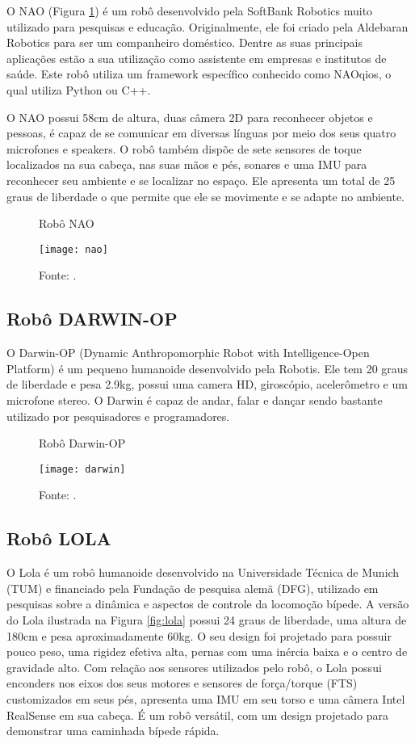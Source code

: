 O NAO (Figura \ref{fig:nao}) é um robô desenvolvido pela SoftBank Robotics muito utilizado para pesquisas e educação. Originalmente, ele foi criado pela Aldebaran Robotics para ser um companheiro doméstico. Dentre as suas principais aplicações estão a sua utilização como assistente em empresas e institutos de saúde. Este robô utiliza um framework específico conhecido como NAOqios, o qual utiliza Python ou C++.  

O NAO possui 58cm de altura, duas câmera 2D para reconhecer objetos e pessoas, é capaz de se comunicar em diversas línguas por meio dos seus quatro microfones e speakers. O robô também dispõe de sete sensores de toque localizados na sua cabeça, nas suas mãos e pés, sonares e uma IMU para reconhecer seu ambiente e se localizar no espaço. Ele apresenta um total de 25 graus de liberdade o que permite que ele se movimente e se adapte no ambiente.

\begin{figure} [H]	
    \centering
    \caption{Robô NAO}
    \texttt{[image: nao]}
    \caption*{Fonte: \cite{NAOxx}.}
    \label{fig:nao}
\end{figure}

\subsection{Robô DARWIN-OP}
\label{ssec:darwin}

O Darwin-OP (Dynamic Anthropomorphic Robot with Intelligence-Open Platform)  é um pequeno humanoide desenvolvido pela Robotis. Ele tem 20 graus de liberdade e pesa 2.9kg, possui uma camera HD, giroscópio, acelerômetro e um microfone stereo. O Darwin é capaz de andar, falar e dançar sendo bastante utilizado por pesquisadores e programadores.

\begin{figure} [H]
    \centering
    \caption{Robô Darwin-OP}
    \texttt{[image: darwin]}
    \caption*{Fonte: \cite{DARWINxx}.}
    \label{fig:darwin}
\end{figure}

\subsection{Robô LOLA}
\label{ssec:lola}

O Lola é um robô humanoide desenvolvido na Universidade Técnica de Munich (TUM) e financiado pela Fundação de pesquisa alemã (DFG), utilizado em pesquisas sobre a dinâmica e aspectos de controle da locomoção bípede. A versão do Lola ilustrada na Figura \ref{fig:lola} possui 24 graus de liberdade, uma altura de 180cm e pesa aproximadamente 60kg. O seu design foi projetado para possuir pouco peso, uma rigidez efetiva alta, pernas com uma inércia baixa e o centro de gravidade alto. Com relação aos sensores utilizados pelo robô, o Lola possui enconders nos eixos dos seus motores e sensores de força/torque (FTS) customizados em seus pés, apresenta uma IMU em seu torso e uma câmera Intel RealSense em sua cabeça. É um robô versátil, com um design projetado para demonstrar uma caminhada bípede rápida.

